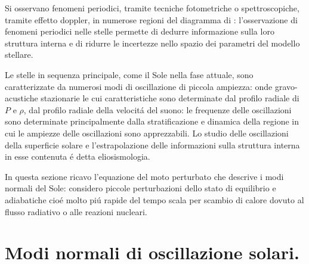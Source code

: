 \documentclass[../main.tex]{subfiles}
\begin{document}
Si osservano fenomeni periodici, tramite tecniche fotometriche o spettroscopiche, tramite effetto doppler, in numerose regioni del diagramma di \hr{}: l'osservazione di fenomeni periodici nelle stelle permette di dedurre informazione sulla loro struttura interna e di ridurre le incertezze nello spazio dei parametri del modello stellare.

Le stelle in sequenza principale, come il Sole nella fase attuale, sono caratterizzate da numerosi modi di oscillazione di piccola ampiezza: onde gravo-acustiche stazionarie le cui caratteristiche sono determinate dal profilo radiale di $P$ e $\rho$, dal profilo radiale della velocit\'a del suono: le frequenze delle oscillazioni sono determinate principalmente dalla stratificazione e dinamica della regione in cui le ampiezze delle oscillazioni sono apprezzabili. Lo studio delle oscillazioni della superficie solare e l'estrapolazione delle informazioni sulla struttura interna in esse contenuta \'e detta eliosismologia.


In questa sezione ricavo l'equazione del moto perturbato che descrive i modi normali del Sole: considero piccole perturbazioni dello stato di equilibrio e adiabatiche cio\'e molto pi\'u rapide del tempo scala per scambio di calore dovuto al flusso radiativo o alle reazioni nucleari.



{\let\clearpage\relax
\chapter{Modi normali di oscillazione solari.}
}
\end{document}
